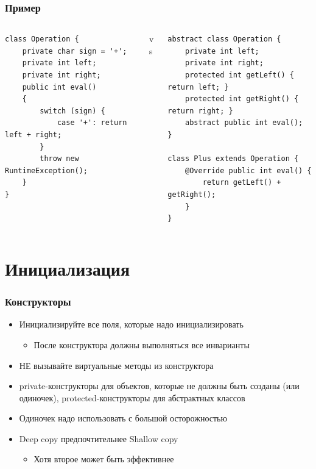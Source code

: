 \documentclass[xetex,mathserif,serif]{beamer}
\begin{document}
	\begin{frame}[fragile]
		\frametitle{Пример}
		\begin{footnotesize}
			\begin{columns}
				\begin{column}{0.35\textwidth}
					\begin{verbatim}
class Operation {
    private char sign = '+';
    private int left;
    private int right;
    public int eval()
    {
        switch (sign) {
            case '+': return left + right;
        }
        throw new RuntimeException();
    }
}
					\end{verbatim}
				\end{column}
				\begin{column}{0.1\textwidth}
					vs
				\end{column}
				\begin{column}{0.45\textwidth}
					\begin{verbatim}
abstract class Operation {
    private int left;
    private int right;
    protected int getLeft() { return left; }
    protected int getRight() { return right; }
    abstract public int eval();
}

class Plus extends Operation {
    @Override public int eval() { 
        return getLeft() + getRight(); 
    }
}
					\end{verbatim}
				\end{column}
			\end{columns}
		\end{footnotesize}
	\end{frame}

	\section{Инициализация}

	\begin{frame}
		\frametitle{Конструкторы}
		\begin{itemize}
			\item Инициализируйте все поля, которые надо инициализировать
			\begin{itemize}
				\item После конструктора должны выполняться все инварианты
			\end{itemize}
			\item НЕ вызывайте виртуальные методы из конструктора
			\item private-конструкторы для объектов, которые не должны быть созданы (или одиночек), protected-конструкторы для абстрактных классов
			\item Одиночек надо использовать с большой осторожностью
			\item Deep copy предпочтительнее Shallow copy
			\begin{itemize}
				\item Хотя второе может быть эффективнее
			\end{itemize}
		\end{itemize}
	\end{frame}
\end{document}

